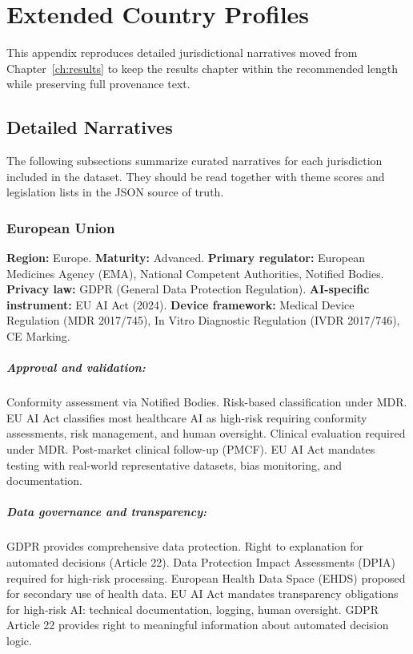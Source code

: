 \chapter{Extended Country Profiles}
\label{app:profiles}

This appendix reproduces detailed jurisdictional narratives moved from Chapter~\ref{ch:results} to keep the results chapter within the recommended length while preserving full provenance text.

{\footnotesize
\titlespacing*{\subsection}{0pt}{0.38em}{0.08em}
\setlength{\parskip}{0pt}

\section{Detailed Narratives}
\label{sec:app-profiles}

The following subsections summarize curated narratives for each jurisdiction included in the dataset. They should be read together with theme scores and legislation lists in the JSON source of truth.


\subsection{European Union}
\textbf{Region:} Europe.
\textbf{Maturity:} Advanced.
\textbf{Primary regulator:} European Medicines Agency (EMA), National Competent Authorities, Notified Bodies.
\textbf{Privacy law:} GDPR (General Data Protection Regulation).
\textbf{AI-specific instrument:} EU AI Act (2024).
\textbf{Device framework:} Medical Device Regulation (MDR 2017/745), In Vitro Diagnostic Regulation (IVDR 2017/746), CE Marking.

\paragraph{Approval and validation:}
Conformity assessment via Notified Bodies. Risk-based classification under MDR. EU AI Act classifies most healthcare AI as high-risk requiring conformity assessments, risk management, and human oversight.
Clinical evaluation required under MDR. Post-market clinical follow-up (PMCF). EU AI Act mandates testing with real-world representative datasets, bias monitoring, and documentation.

\paragraph{Data governance and transparency:}
GDPR provides comprehensive data protection. Right to explanation for automated decisions (Article 22). Data Protection Impact Assessments (DPIA) required for high-risk processing. European Health Data Space (EHDS) proposed for secondary use of health data.
EU AI Act mandates transparency obligations for high-risk AI: technical documentation, logging, human oversight. GDPR Article 22 provides right to meaningful information about automated decision logic.

}
